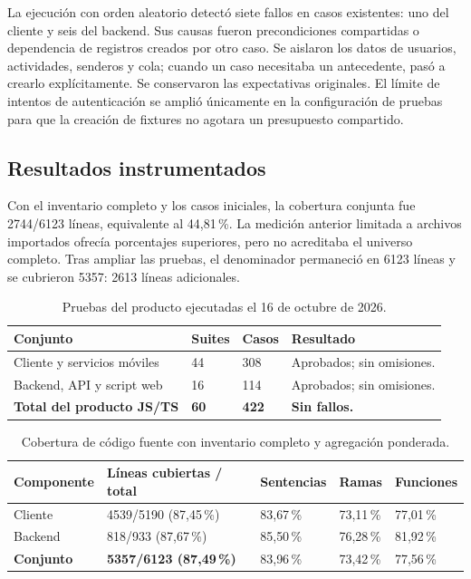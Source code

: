 La ejecución con orden aleatorio detectó siete fallos en casos existentes: uno del cliente y seis del backend. Sus causas fueron precondiciones compartidas o dependencia de registros creados por otro caso. Se aislaron los datos de usuarios, actividades, senderos y cola; cuando un caso necesitaba un antecedente, pasó a crearlo explícitamente. Se conservaron las expectativas originales. El límite de intentos de autenticación se amplió únicamente en la configuración de pruebas para que la creación de fixtures no agotara un presupuesto compartido.

\subsection{Resultados instrumentados}

Con el inventario completo y los casos iniciales, la cobertura conjunta fue 2744/6123 líneas, equivalente al 44{,}81\,\%. La medición anterior limitada a archivos importados ofrecía porcentajes superiores, pero no acreditaba el universo completo. Tras ampliar las pruebas, el denominador permaneció en 6123 líneas y se cubrieron 5357: 2613 líneas adicionales.

\begin{table}[H]
\centering
\small
\setlength{\tabcolsep}{4pt}
\renewcommand{\arraystretch}{1.15}
\begin{tabular}{|p{4.6cm}|p{2cm}|p{2cm}|p{4cm}|}
\hline
\textbf{Conjunto} & \textbf{Suites} & \textbf{Casos} & \textbf{Resultado} \\
\hline
Cliente y servicios móviles & 44 & 308 & Aprobados; sin omisiones. \\
\hline
Backend, API y script web & 16 & 114 & Aprobados; sin omisiones. \\
\hline
\textbf{Total del producto JS/TS} & \textbf{60} & \textbf{422} & \textbf{Sin fallos.} \\
\hline
\end{tabular}
\caption{Pruebas del producto ejecutadas el 16 de octubre de 2026.}
\label{tab:resultados-pruebas}
\end{table}

\begin{table}[H]
\centering
\small
\setlength{\tabcolsep}{4pt}
\renewcommand{\arraystretch}{1.15}
\begin{tabular}{|p{2.7cm}|p{3.1cm}|p{2cm}|p{2cm}|p{2cm}|}
\hline
\textbf{Componente} & \textbf{Líneas cubiertas / total} & \textbf{Sentencias} & \textbf{Ramas} & \textbf{Funciones} \\
\hline
Cliente & 4539/5190 (87{,}45\,\%) & 83{,}67\,\% & 73{,}11\,\% & 77{,}01\,\% \\
\hline
Backend & 818/933 (87{,}67\,\%) & 85{,}50\,\% & 76{,}28\,\% & 81{,}92\,\% \\
\hline
\textbf{Conjunto} & \textbf{5357/6123 (87{,}49\,\%)} & 83{,}96\,\% & 73{,}42\,\% & 77{,}56\,\% \\
\hline
\end{tabular}
\caption{Cobertura de código fuente con inventario completo y agregación ponderada.}
\label{tab:cobertura-instrumentada}
\end{table}

